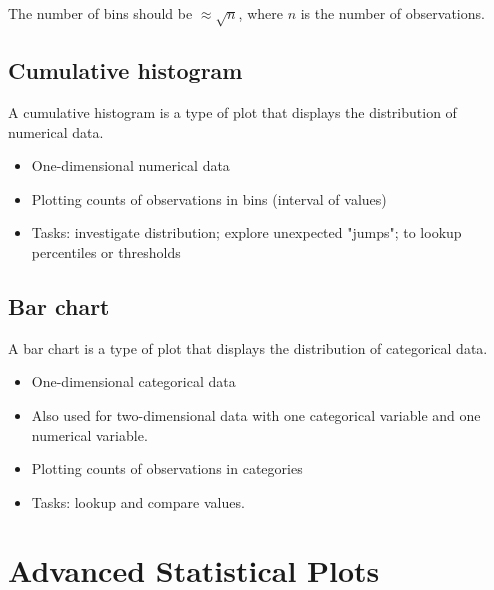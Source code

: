 \begin{remark}
    The number of bins should be $\approx \sqrt{n}$, where $n$ is the number of observations.
\end{remark}

\subsection{Cumulative histogram}
\begin{definition}
    A cumulative histogram is a type of plot that displays the distribution of numerical data.

    \begin{itemize}
        \item One-dimensional numerical data
        \item Plotting counts of observations in bins (interval of values)
        \item Tasks: investigate distribution; explore unexpected "jumps"; to lookup percentiles or thresholds
    \end{itemize}

\end{definition}

\subsection{Bar chart}
\begin{definition}
    A bar chart is a type of plot that displays the distribution of categorical data.

    \begin{itemize}
        \item One-dimensional categorical data
        \item Also used for two-dimensional data with one categorical variable and one numerical variable.
        \item Plotting counts of observations in categories
        \item Tasks: lookup and compare values.
    \end{itemize}
\end{definition}

\section{Advanced Statistical Plots}
